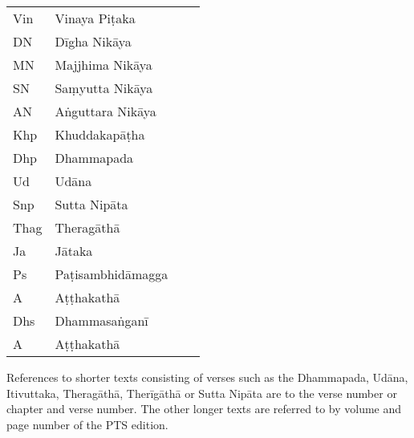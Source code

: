 \clearpage
\thispagestyle{empty}

{}
\bigskip

{\raggedright
\ifhandbookedition
\fontsize{9}{13}\selectfont
\else
\fontsize{10}{14}\selectfont
\fi

\begin{tabular}{@{}llll@{}}
  Vin  & Vinaya Piṭaka     &       &                 \\
  DN   & Dīgha Nikāya      &       &                 \\
  MN   & Majjhima Nikāya   &       &                 \\
  SN   & Saṃyutta Nikāya   &       &                 \\
  AN   & Aṅguttara Nikāya  &       &                 \\
  Khp  & Khuddakapāṭha     &       &                 \\
  Dhp  & Dhammapada        &       &                 \\
  Ud   & Udāna             &       &                 \\
  Snp  & Sutta Nipāta      &       &                 \\
  Thag & Theragāthā        &       &                 \\
  Ja   & Jātaka            &       &                 \\
  Ps   & Paṭisambhidāmagga &       &                 \\
  A    & Aṭṭhakathā        &       &                 \\
  Dhs  & Dhammasaṅganī     &       &                 \\
  A    & Aṭṭhakathā        &       &                 \\

\end{tabular}

\bigskip

References to shorter texts consisting of verses such as the Dhammapada, Udāna,
Itivuttaka, Theragāthā, Therīgāthā or Sutta Nipāta are to the verse number or
chapter and verse number. The other longer texts are referred to by volume and
page number of the PTS edition.

}

